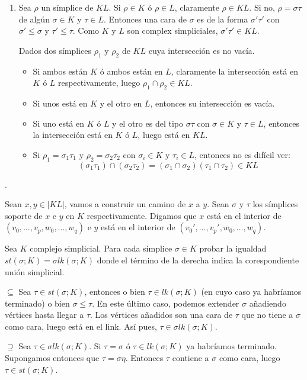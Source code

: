 \documentclass[twoside]{article}
\begin{document}
\begin{solucion}\mbox{}
\begin{enumerate}
\item Sea $ρ$ un símplice de $KL$. Si $ρ \in K$ ó $ρ \in L$, claramente $ρ \in KL$.
Si no, $ρ = στ$de algún $σ \in K$ y $τ \in L$.
Entonces una cara de $σ$ es de la forma $σ'τ'$ con $σ' ≤ σ$ y $τ' ≤ τ$.
Como $K$ y $L$ son complex simpliciales, $σ'τ' \in KL$.

Dados dos símplices $ρ_1$ y $ρ_2$ de $KL$ cuya intersección es no vacía.
\begin{itemize}
\item Si ambos están $K$ ó ambos están en $L$, claramente la intersección está en $K$ ó $L$ respectivamente, luego $ρ_1 \cap ρ_2 \in KL$.
\item Si unos está en $K$ y el otro en $L$, entonces su intersección es vacía.
\item Si uno está en $K$ ó $L$ y el otro es del tipo $στ$ con $σ \in K$ y $τ \in L$, entonces la intersección está en $K$ ó $L$, luego está en $KL$.
\item Si $ρ_1 = σ_1τ_1$ y $ρ_2 = σ_2τ_2$ con $σ_i \in K$ y $τ_i \in L$, entonces no es difícil ver:
\[ (σ_1τ_1) \cap (σ_2τ_2) = (σ_1 \cap σ_2)(τ_1 \cap τ_2) \in KL \]
\end{itemize}
\end{enumerate}
\item .
\item Sean $x,y \in |KL|$, vamos a construir un camino de $x$ a $y$.
Sean $σ$ y $τ$ los símplices soporte de $x$ e $y$ en $K$ respectivamente.
Digamos que $x$ está en el interior de $(v_0,\dots,v_p,w_0,\dots,w_q)$ e $y$ está en el interior de $(v_0',\dots,v_p',w_0,\dots,w_q)$.
\end{solucion}


\newpage

\begin{ejercicio}{1.3}
Sea $K$ complejo simplicial.
Para cada símplice $σ \in K$ probar la igualdad $st(σ;K) = σlk(σ;K)$ donde el término de la derecha indica la corespondiente unión simplicial.
\end{ejercicio}
\begin{solucion}
$\boxed{\subseteq}$ Sea $\tau\in st(σ;K)$, entonces o bien $\tau\in lk(σ;K)$ (en cuyo caso ya habríamos terminado) o bien $\sigma\leq\tau$. En este último caso, podemos extender $\sigma$ añadiendo vértices hasta llegar a $\tau$. Los vértices añadidos son una cara de $\tau$ que no tiene a $\sigma$ como cara, luego está en el link. Así pues, $\tau\in σlk(σ;K)$. 

$\boxed{\supseteq}$ Sea $\tau\in σlk(σ;K)$. Si $\tau=\sigma$ ó $\tau\in lk(σ;K)$ ya habríamos terminado. Supongamos entonces que $\tau=\sigma\eta$. Entonces $\tau$ contiene a $\sigma$ como cara, luego $\tau\in st(σ;K)$.
\end{solucion}
\end{document}
